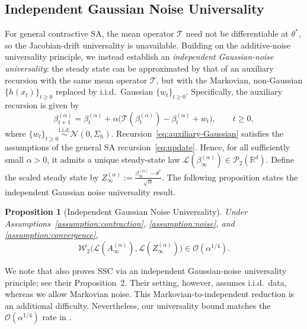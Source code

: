 \documentclass[11pt,letterpaper]{article}
\theoremstyle{plain}
\newtheorem{proposition}{Proposition}
\theoremstyle{definition}
\theoremstyle{remark}
\newcommand{\mT}{\mathcal{T}}
\newcommand{\W}{\mathcal{W}}
\newcommand{\law}{\mathcal{L}}
\begin{document}
\subsection{Independent Gaussian Noise Universality}\label{sec:ind-Gaussian-universality}
For general contractive SA, the mean operator \(\mT\) need not be
differentiable at \(\theta^*\), so the Jacobian-drift universality 
is unavailable. Building on the additive-noise universality principle, we
instead establish an \emph{independent Gaussian-noise universality}:
the steady state can be approximated by that of an auxiliary recursion with
the same mean operator \(\mT\), but with the Markovian, non-Gaussian 
\(\{h(x_t)\}_{t\geq0}\) replaced by i.i.d.\ Gaussian 
\(\{w_t\}_{t\geq0}\). Specifically, the auxiliary recursion is given by
\begin{equation}
\label{eq:auxiliary-Gaussian}
    \beta_{t+1}^{(\alpha)}
    =
    \beta_t^{(\alpha)}
    +
    \alpha\Big(
        \mT(\beta_t^{(\alpha)})
        -
        \beta_t^{(\alpha)}
        +
        w_t
    \Big),
    \qquad t\geq0,
\end{equation}
where \(\{w_t\}_{t\geq0} \overset{\mathrm{i.i.d.}}{\sim} \mathcal{N}(0,\Sigma_h).\) Recursion~\eqref{eq:auxiliary-Gaussian} satisfies the assumptions of the general SA recursion~\eqref{eq:update}. Hence, for all sufficiently small \(\alpha>0\), it admits a unique steady-state law \(\law(\beta_\infty^{(\alpha)})\in\mathcal{P}_2(\mathbb{R}^d)\). Define the scaled steady state by $Z_\infty^{(\alpha)}
    :=
    \frac{\beta_\infty^{(\alpha)}-\theta^*}{\sqrt{\alpha}}.$ The following proposition states the independent Gaussian
noise universality result.

\begin{proposition}[Independent Gaussian Noise Universality]
\label{prop:ind-Gaussian}
Under Assumptions~\ref{assumption:contraction}, \ref{assumption:noise},
and \ref{assumption:convergence},
\[
    \W_2\bigl(\law(A_\infty^{(\alpha)}),\law(Z_\infty^{(\alpha)})\bigr)
    \in\mathcal O(\alpha^{1/4}).
\]
\end{proposition}
We note that \cite{zhang2024prelimit} also proves SSC via an independent
Gaussian-noise universality principle; see their Proposition~2. Their setting,
however, assumes i.i.d.\ data, whereas we allow Markovian noise. This
Markovian-to-independent reduction is an additional difficulty. Nevertheless,
our universality bound matches the \(\mathcal O(\alpha^{1/4})\) rate in
\cite{zhang2024prelimit}.
\end{document}
